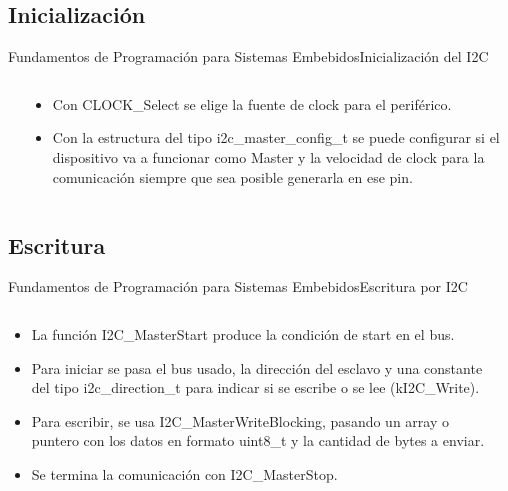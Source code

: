 \documentclass[aspectratio=169, xcolor=dvipsnames]{beamer}
\begin{document}
\subsection{Inicialización}
\begin{frame}{Fundamentos de Programación para Sistemas Embebidos}{Inicialización del I2C}
\begin{columns}
\begin{column}{0.5\textwidth}

\end{column}
\begin{column}{0.5\textwidth}
\begin{itemize}
    \item Con \textcolor{myblue}{CLOCK\_Select} se elige la fuente de clock para el periférico.
    \item Con la estructura del tipo \textcolor{myblue}{i2c\_master\_config\_t} se puede configurar si el dispositivo va a funcionar como Master y la velocidad de clock para la comunicación siempre que sea posible generarla en ese pin.
\end{itemize}
\end{column}
\end{columns}
\end{frame}

\subsection{Escritura}
\begin{frame}{Fundamentos de Programación para Sistemas Embebidos}{Escritura por I2C}
\begin{columns}
\begin{column}{0.5\textwidth}
\begin{itemize}
    \item La función \textcolor{myblue}{I2C\_MasterStart} produce la condición de start en el bus.
    \item Para iniciar se pasa el bus usado, la dirección del esclavo y una constante del tipo \textcolor{myblue}{i2c\_direction\_t} para indicar si se escribe o se lee (\textcolor{myblue}{kI2C\_Write}).
    \item Para escribir, se usa \textcolor{myblue}{I2C\_MasterWriteBlocking}, pasando un array o puntero con los datos en formato \textcolor{myblue}{uint8\_t} y la cantidad de bytes a enviar.
    \item Se termina la comunicación con \textcolor{myblue}{I2C\_MasterStop}.
\end{itemize}
\end{column} 
\begin{column}{0.5\textwidth}

\end{column}
\end{columns}
\end{frame}
\end{document}
